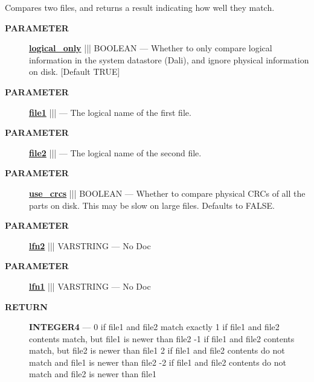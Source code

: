\par





Compares two files, and returns a result indicating how well they match.






\par
\begin{description}
\item [\colorbox{tagtype}{\color{white} \textbf{\textsf{PARAMETER}}}] \textbf{\underline{logical\_only}} ||| BOOLEAN --- Whether to only compare logical information in the system datastore (Dali), and ignore physical information on disk. [Default TRUE]
\item [\colorbox{tagtype}{\color{white} \textbf{\textsf{PARAMETER}}}] \textbf{\underline{file1}} |||  --- The logical name of the first file.
\item [\colorbox{tagtype}{\color{white} \textbf{\textsf{PARAMETER}}}] \textbf{\underline{file2}} |||  --- The logical name of the second file.
\item [\colorbox{tagtype}{\color{white} \textbf{\textsf{PARAMETER}}}] \textbf{\underline{use\_crcs}} ||| BOOLEAN --- Whether to compare physical CRCs of all the parts on disk. This may be slow on large files. Defaults to FALSE.
\item [\colorbox{tagtype}{\color{white} \textbf{\textsf{PARAMETER}}}] \textbf{\underline{lfn2}} ||| VARSTRING --- No Doc
\item [\colorbox{tagtype}{\color{white} \textbf{\textsf{PARAMETER}}}] \textbf{\underline{lfn1}} ||| VARSTRING --- No Doc
\end{description}







\par
\begin{description}
\item [\colorbox{tagtype}{\color{white} \textbf{\textsf{RETURN}}}] \textbf{INTEGER4} --- 0 if file1 and file2 match exactly 1 if file1 and file2 contents match, but file1 is newer than file2 -1 if file1 and file2 contents match, but file2 is newer than file1 2 if file1 and file2 contents do not match and file1 is newer than file2 -2 if file1 and file2 contents do not match and file2 is newer than file1
\end{description}





